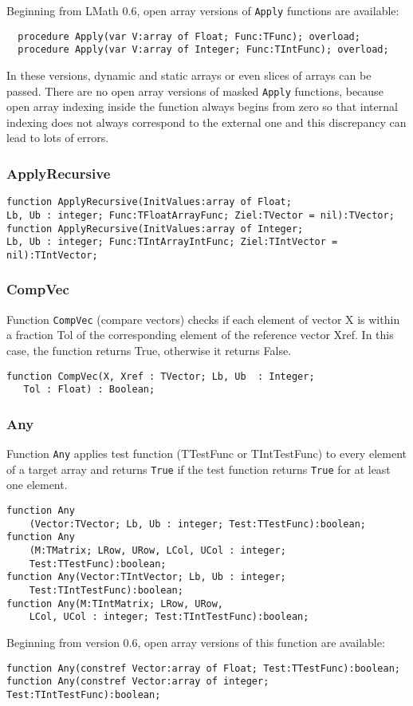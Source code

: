 \documentclass[12pt,a4paper,oneside]{article}
\newcommand{\code}[1]{\texttt{#1}}
\begin{document}
Beginning from LMath 0.6, open array versions of \code{Apply} functions are available:
\begin{verbatim}
  procedure Apply(var V:array of Float; Func:TFunc); overload;
  procedure Apply(var V:array of Integer; Func:TIntFunc); overload;
\end{verbatim}
In these versions, dynamic and static arrays or even slices of arrays can be passed. There are no open array versions of masked \code{Apply} functions, because open array indexing inside the function always begins from zero so that internal indexing does not always correspond to the external one and this discrepancy can lead to lots of errors.

\subsubsection{ApplyRecursive}

\begin{verbatim}
function ApplyRecursive(InitValues:array of Float;
Lb, Ub : integer; Func:TFloatArrayFunc; Ziel:TVector = nil):TVector; 
function ApplyRecursive(InitValues:array of Integer;
Lb, Ub : integer; Func:TIntArrayIntFunc; Ziel:TIntVector = nil):TIntVector;
\end{verbatim} 
\subsubsection{CompVec}
Function \code{CompVec} (compare vectors) checks if each element of vector X is within a fraction Tol of	the corresponding element of the reference vector Xref. In this case, the function returns True, otherwise it returns False.
\begin{verbatim}
function CompVec(X, Xref : TVector; Lb, Ub  : Integer; 
   Tol : Float) : Boolean;
\end{verbatim}
\subsubsection{Any}
Function \code{Any} applies test function (TTestFunc or TIntTestFunc) to every element of a target array and returns \code{True} if the test function returns \code{True} for at least one element. 

\begin{verbatim}
function Any
    (Vector:TVector; Lb, Ub : integer; Test:TTestFunc):boolean;
function Any
    (M:TMatrix; LRow, URow, LCol, UCol : integer; 
    Test:TTestFunc):boolean;
function Any(Vector:TIntVector; Lb, Ub : integer;
    Test:TIntTestFunc):boolean; 
function Any(M:TIntMatrix; LRow, URow, 
    LCol, UCol : integer; Test:TIntTestFunc):boolean; 
\end{verbatim}
Beginning from version 0.6, open array versions of this function are available:
\begin{verbatim}
function Any(constref Vector:array of Float; Test:TTestFunc):boolean;
function Any(constref Vector:array of integer; Test:TIntTestFunc):boolean;
\end{verbatim}
\end{document}
